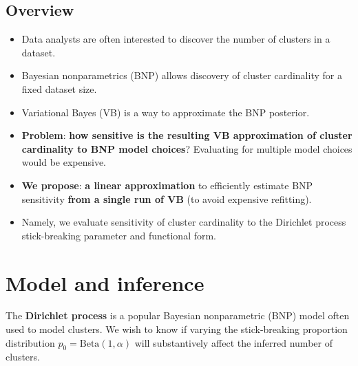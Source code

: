 \documentclass[a0,plainsections,30pt]{sciposter}\usepackage[]{graphicx}\usepackage[]{color}
\begin{document}
\begin{minipage}[t]{0.45\textwidth}

\begin{mdframed}[style=MyFrame]
\section*{Overview}
\vspace{-0.3in}
\begin{itemize}

\item Data analysts are often interested to discover the number of
clusters in a dataset. 
\item Bayesian nonparametrics (BNP) allows discovery of cluster
cardinality for a fixed dataset size. 
\item Variational Bayes (VB) is a way to approximate the BNP posterior. 
\item \textbf{Problem}: \textbf{how sensitive is the resulting
VB approximation of cluster cardinality to BNP model choices}? Evaluating
for multiple model choices would be expensive. 
\item \textbf{We propose}: \textbf{a linear approximation} to efficiently
estimate BNP sensitivity \textbf{from a single run of VB} (to avoid
expensive refitting). 
\item Namely, we evaluate sensitivity of cluster cardinality to the Dirichlet process
stick-breaking parameter and functional form. 

\end{itemize}
\end{mdframed}
\vspace{-0.7in}

\section*{Model and inference }
\vspace{-0.3in}

The \textbf{Dirichlet process} is a popular Bayesian nonparametric
(BNP) model often used to model clusters. We wish to know if
varying the stick-breaking proportion distribution $p_0 = \text{Beta}(1, \alpha)$ will substantively affect the inferred number of clusters.


\end{minipage}
\end{document}
